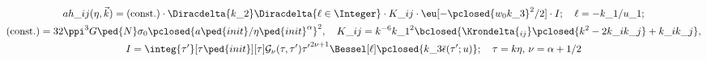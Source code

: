 \section{}

\begin{multline}
    ah\_{ij}(\eta, \vec{k}) = \text{(const.)} \cdot  \Diracdelta{k\_2} \Diracdelta{\ell\in \Integer} \cdot K\_{ij}\cdot \eu[-\pclosed{w_0 k\_3}^2/2] \cdot I; \quad \ell = -k\_1 /u\_1 ; \\
    \text{(const.)}= 32\ppi^3 G\ped{N} \sigma_0 {\pclosed{a\ped{init}/\eta\ped{init}^\alpha}}^2,\quad
    K\_{ij} = k^{-6} {k\_1}^2 \bclosed{ \Krondelta{_{ij}} \pclosed{k^2-2k\_i k\_j} + k\_i k\_j},\\
    I = \integ{\tau'}[\tau\ped{init}][\tau] \mathcal{G}_{\nu}(\tau, \tau') {\tau'}^{2\nu+1} \Bessel[\ell]\pclosed{k\_3 \bar{\epsilon}(\tau'; u)};\quad \tau=k\eta, \, \nu = \alpha+1/2
\end{multline}